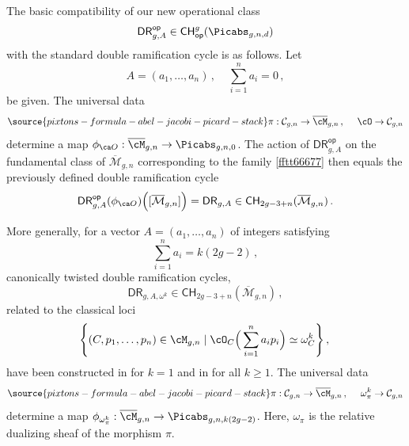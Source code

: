 The basic compatibility of our new operational class $$\mathsf{DR}^{\mathsf{op}}_{g,A} \in {\mathsf{CH}}^g_{\mathsf{op}}(\Picabs_{g,n,d})$$ with the
standard double ramification cycle is as follows.
Let
$$A = (a_1, \dots, a_n)\,,\ \ \ \ \  \sum_{i=1}^n a_i=0 \,,$$
be given.
The universal data
\begin{equation}\label{fftt66677}
\source{pixtons-formula-abel-jacobi-picard-stack}
\pi: \mathcal{C}_{g,n} \rightarrow \overline{\cM}_{g,n}\, , \ \ \ \ \cO \rightarrow \mathcal{C}_{g,n}
\end{equation}
determine a map $\phi_{\ca O} : \overline{\cM}_{g,n} \to \Picabs_{g,n,0}$.
The action of $\mathsf{DR}^{\mathsf{op}}_{g,A}$ on the fundamental class
of $\overline{\mathcal{M}}_{g,n}$ corresponding to the family \eqref{fftt66677} then equals the previously defined
double ramification cycle
$$\mathsf{DR}^{\mathsf{op}}_{g,A}(\phi_{\ca O})\Big( [\overline{\mathcal{M}}_{g,n}]\Big)= \mathsf{DR}_{g,A}
\in {\mathsf{CH}}_{2g-3+n}(\overline{\mathcal{M}}_{g,n})
\, .$$




More generally,
for a vector $A = (a_1, \dots, a_n)$ of integers satisfying
$$\sum_{i=1}^n a_i = k(2g-2)\,, $$
canonically twisted double ramification cycles,
$$\mathsf{DR}_{g,A, \omega^k}
\in {\mathsf{CH}}_{2g-3+n}(\overline{\mathcal{M}}_{g,n})\, ,$$
related to the classical loci
\begin{equation*}
\left\{ (C, p_1, \dots, p_n) \in \cM_{g,n} \mid
\cO_C\Big(\sum_{i=1}^n a_i p_i\Big) \simeq  \omega^k_C \right\},\,
\end{equation*}
have been constructed in
\cite{Guere2016A-generalizatio} for $k=1$ and in \cite{Holmes2017Extending-the-d,Holmes2017Jacobian-extens,Marcus2017Logarithmic-com} for all $k\geq 1$.
The universal data
\begin{equation}\label{fftt66672}
\source{pixtons-formula-abel-jacobi-picard-stack}
\pi: \mathcal{C}_{g,n} \rightarrow \overline{\cM}_{g,n}\, , \ \ \ \ \omega_\pi^k \rightarrow \mathcal{C}_{g,n}
\end{equation}
determine a map
$\phi_{\omega_\pi^k} : \overline{\cM}_{g,n} \to \Picabs_{g,n,k(2g-2)}$.
Here,
$\omega_\pi$ is the relative dualizing sheaf
of the morphism $\pi$.

